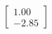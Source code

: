 \documentclass[preview]{standalone}
\begin{document}
\begin{align*}
\begin{bmatrix} 1.00 \\ -2.85 \end{bmatrix}
\end{align*}
\end{document}

